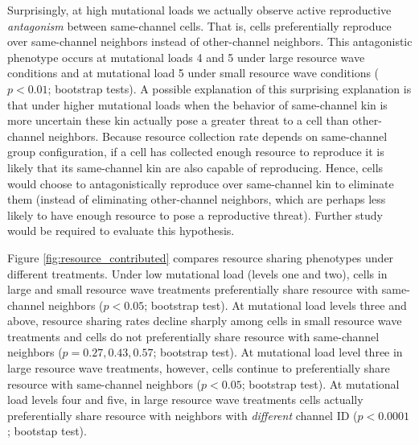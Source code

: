 Surprisingly, at high mutational loads we actually observe active reproductive \textit{antagonism} between same-channel cells.
That is, cells preferentially reproduce over same-channel neighbors instead of other-channel neighbors.
This antagonistic phenotype occurs at mutational loads 4 and 5 under large resource wave conditions and at mutational load 5 under small resource wave conditions ($p < 0.01$; bootstrap tests).
A possible explanation of this surprising explanation is that under higher mutational loads when the behavior of same-channel kin is more uncertain these kin actually pose a greater threat to a cell than other-channel neighbors.
Because resource collection rate depends on same-channel group configuration, if a cell has collected enough resource to reproduce it is likely that its same-channel kin are also capable of reproducing.
Hence, cells would choose to antagonistically reproduce over same-channel kin to eliminate them (instead of eliminating other-channel neighbors, which are perhaps less likely to have enough resource to pose a reproductive threat).
Further study would be required to evaluate this hypothesis.



Figure \ref{fig:resource_contributed} compares resource sharing phenotypes under different treatments.
Under low mutational load (levels one and two), cells in large and small resource wave treatments preferentially share resource with same-channel neighbors ($p < 0.05$; bootstrap test).
At mutational load levels three and above, resource sharing rates decline sharply among cells in small resource wave treatments and cells do not preferentially share resource with same-channel neighbors ($p = 0.27, 0.43, 0.57$; bootstrap test).
At mutational load level three in large resource wave treatments, however, cells continue to preferentially share resource with same-channel neighbors ($p < 0.05$; bootstrap test).
At mutational load levels four and five, in large resource wave treatments cells actually preferentially share resource with neighbors with \textit{different} channel ID ($p < 0.0001$; bootstap test).




